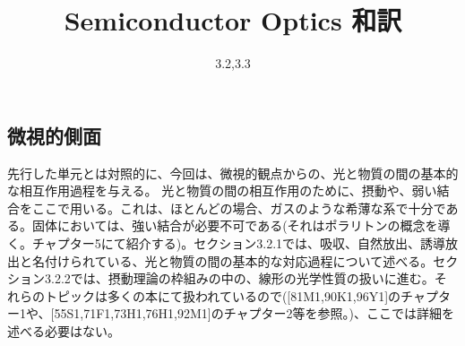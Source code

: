 \documentclass[11pt,a4j,uplatex]{jsarticle}
\title{Semiconductor Optics 和訳}
\author{3.2,3.3}
\begin{document}
\maketitle %

\thispagestyle{empty}%
\clearpage
\addtocounter{page}{-1}


\tableofcontents %

\thispagestyle{empty}%
\clearpage
\addtocounter{page}{-1}

\fi
\setcounter{section}{3}
\setcounter{subsection}{1}
\setcounter{figure}{15}
\newpage
\subsection{微視的側面}
先行した単元とは対照的に、今回は、微視的観点からの、光と物質の間の基本的な相互作用過程を与える。
光と物質の間の相互作用のために、摂動や、弱い結合をここで用いる。これは、ほとんどの場合、ガスのような希薄な系で十分である。固体においては、強い結合が必要不可である(それはポラリトンの概念を導く。チャプター5にて紹介する)。セクション3.2.1では、吸収、自然放出、誘導放出と名付けられている、光と物質の間の基本的な対応過程について述べる。セクション3.2.2では、摂動理論の枠組みの中の、線形の光学性質の扱いに進む。それらのトピックは多くの本にて扱われているので([81M1,90K1,96Y1]のチャプター1や、[55S1,71F1,73H1,76H1,92M1]のチャプター2等を参照。)、ここでは詳細を述べる必要はない。
\end{document}
